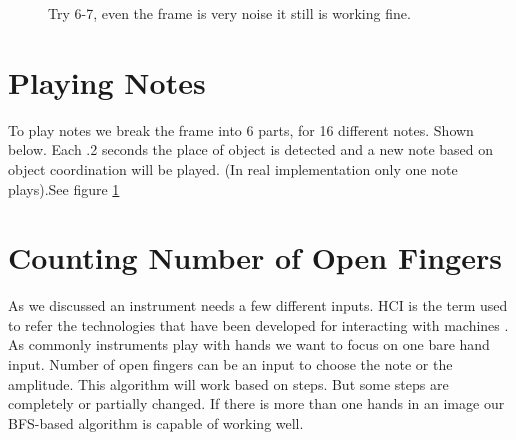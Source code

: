 \begin{figure}
\caption{Try 6-7, even the frame is very noise it  still is working fine.}
\label{fig:parts}
\end{figure}

\section{Playing Notes}
To play notes we break the frame into 6 parts, for 16 different notes. Shown below. Each .2 seconds the place of object is detected and a new note based on object coordination will be played. (In real implementation only one note plays).See figure \ref{fig:parts}

\section{Counting Number of Open Fingers}
As we discussed an instrument needs a few different inputs. HCI
is the term used to refer the technologies that have been developed for interacting with machines \cite{dey2014algorithm}. As commonly instruments play with hands we want to focus on one bare hand input. Number of open fingers can be an input to choose the note or the amplitude. This algorithm will work based on \cite{dey2014algorithm} steps. But some steps are completely or partially changed. If there is more than one hands in an image our BFS-based algorithm is capable of working well.
